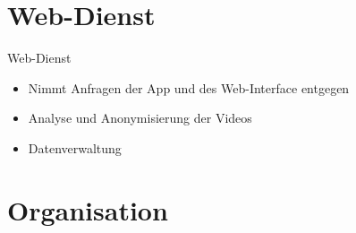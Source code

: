 \documentclass[18pt]{beamer}
\begin{document}
\section{Web-Dienst}
\begin{frame}{Web-Dienst}
	\begin{itemize}
		\item Nimmt Anfragen der App und des Web-Interface entgegen
		\pause
		\item Analyse und Anonymisierung der Videos
		\pause
		\item Datenverwaltung
	\end{itemize}
\end{frame}

\section{Organisation}
\end{document}
